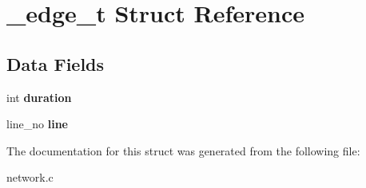 \hypertarget{struct__edge__t}{}\section{\+\_\+edge\+\_\+t Struct Reference}
\label{struct__edge__t}
\subsection*{Data Fields}
\begin{DoxyCompactItemize}
\item 
\hypertarget{struct__edge__t_a5f949a1dd5d0737e85e259079300a7ae}{}int {\bfseries duration}\label{struct__edge__t_a5f949a1dd5d0737e85e259079300a7ae}

\item 
\hypertarget{struct__edge__t_a74e174c330327145806146f19e43ca63}{}line\+\_\+no {\bfseries line}\label{struct__edge__t_a74e174c330327145806146f19e43ca63}

\end{DoxyCompactItemize}


The documentation for this struct was generated from the following file\+:\begin{DoxyCompactItemize}
\item 
network.\+c\end{DoxyCompactItemize}
